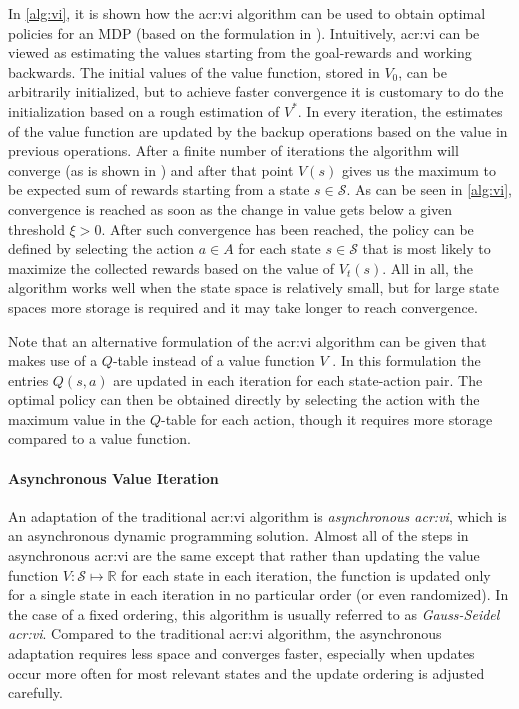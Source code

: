 In \autoref{alg:vi}, it is shown how the \acrshort{acr:vi} algorithm can be used to obtain optimal policies for an MDP (based on the formulation in \cite{poole2010artificial}).
Intuitively, \acrshort{acr:vi} can be viewed as estimating the values starting from the goal-rewards and working backwards.
The initial values of the value function, stored in $V_0$, can be arbitrarily initialized, but to achieve faster convergence it is customary to do the initialization based on a rough estimation of $V^*$.
In every iteration, the estimates of the value function are updated by the backup operations based on the value in previous operations.
After a finite number of iterations the algorithm will converge (as is shown in \cite{puterman2014markov}) and after that point $V(s)$ gives us the maximum to be expected sum of rewards starting from a state $s \in \mathcal{S}$.
As can be seen in \autoref{alg:vi}, convergence is reached as soon as the change in value gets below a given threshold $\xi > 0$.
After such convergence has been reached, the policy can be defined by selecting the action $a \in A$ for each state $s \in \mathcal{S}$ that is most likely to maximize the collected rewards based on the value of $V_t(s)$.
All in all, the algorithm works well when the state space is relatively small, but for large state spaces more storage is required and it may take longer to reach convergence.

Note that an alternative formulation of the \acrshort{acr:vi} algorithm can be given that makes use of a $Q$-table instead of a value function $V$ \cite{singh2000convergence}.
In this formulation the entries $Q(s, a)$ are updated in each iteration for each state-action pair.
The optimal policy can then be obtained directly by selecting the action with the maximum value in the $Q$-table for each action, though it requires more storage compared to a value function.

\paragraph{Asynchronous Value Iteration}
\label{sec:gs-value-iteration}

An adaptation of the traditional \acrshort{acr:vi} algorithm is \textit{asynchronous \acrshort{acr:vi}}, which is an asynchronous dynamic programming solution.
Almost all of the steps in asynchronous \acrshort{acr:vi} are the same except that rather than updating the value function $V: \mathcal{S} \mapsto \mathbb{R}$ for each state in each iteration, the function is updated only for a single state in each iteration in no particular order (or even randomized).
In the case of a fixed ordering, this algorithm is usually referred to as \textit{Gauss-Seidel \acrshort{acr:vi}}.
Compared to the traditional \acrshort{acr:vi} algorithm, the asynchronous adaptation requires less space and converges faster, especially when updates occur more often for most relevant states and the update ordering is adjusted carefully.

